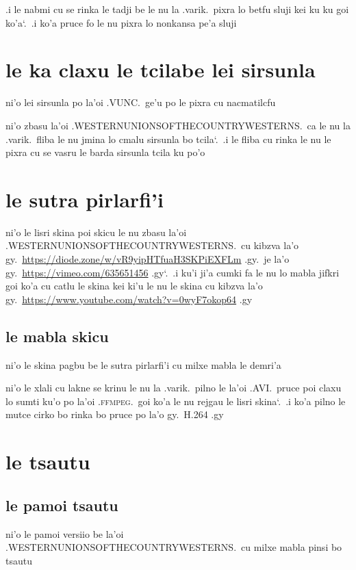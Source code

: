\documentclass{report}
\newcommand\sds{\spacefactor\sfcode`.\ \space}
\begin{document}
.i le nabmi cu se rinka le tadji be le nu la .varik.\ pixra lo betfu sluji kei ku ku goi ko'a\sds  .i ko'a pruce fo le nu pixra lo nonkansa pe'a sluji

\section{le ka claxu le tcilabe lei sirsunla}
ni'o lei sirsunla po la'oi .VUNC.\ ge'u po le pixra cu nacmatilcfu

ni'o zbasu la'oi .WESTERNUNIONSOFTHECOUNTRYWESTERNS.\ ca le nu la .varik.\ fliba le nu jmina lo cmalu sirsunla bo tcila\sds  .i le fliba cu rinka le nu le pixra cu se vasru le barda sirsunla tcila ku po'o

\section{le sutra pirlarfi'i}
ni'o le lisri skina poi skicu le nu zbasu la'oi .WESTERNUNIONSOFTHECOUNTRYWESTERNS.\ cu kibzva la'o gy.\ \url{https://diode.zone/w/vR9yipHTfuaH3SKPiEXFLm} .gy.\ je la'o gy.\ \url{https://vimeo.com/635651456} .gy\sds  .i ku'i ji'a cumki fa le nu lo mabla jifkri goi ko'a cu catlu le skina kei ki'u le nu le skina cu kibzva la'o gy.\ \url{https://www.youtube.com/watch?v=0wyF7okop64} .gy

\subsection{le mabla skicu}
ni'o le skina pagbu be le sutra pirlarfi'i cu milxe mabla le demri'a

ni'o le xlali cu lakne se krinu le nu la .varik.\ pilno le la'oi .AVI.\ pruce poi claxu lo sumti ku'o po la'oi .\textsc{ffmpeg}.\ goi ko'a le nu rejgau le lisri skina\sds  .i ko'a pilno le mutce cirko bo rinka bo pruce po la'o gy.\ H.264 .gy

\section{le tsautu}
\subsection{le pamoi tsautu}
ni'o le pamoi versiio be la'oi .WESTERNUNIONSOFTHECOUNTRYWESTERNS.\ cu milxe mabla pinsi bo tsautu
\end{document}
